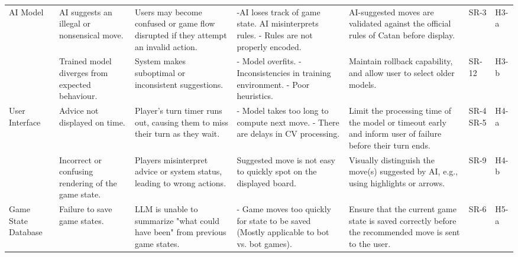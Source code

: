 \documentclass{article}
\begin{document}
\begin{landscape}
\begin{tabularx}{\linewidth}{|P{2.5cm}|Y|Y|Y|Y|P{1cm}|P{1cm}|}
        \hline

        AI Model &
        AI suggests an illegal or nonsensical move. &
        Users may become confused or game flow disrupted if they attempt an invalid action. &
        -AI loses track of game state. \newline AI misinterprets rules. \newline - Rules are not properly encoded. &
        AI-suggested moves are validated against the official rules of Catan before display. &
        SR-3 &
        H3-a \\

        &
        Trained model diverges from expected behaviour. &
        System makes suboptimal or inconsistent suggestions. &
        - Model overfits. \newline - Inconsistencies in training environment. \newline - Poor heuristics. &
        Maintain rollback capability, and allow user to select older models. &
        SR-12 &
        H3-b \\


        \hline

        User Interface &
        Advice not displayed on time. &
        Player's turn timer runs out, causing them to miss their turn as they wait. &
        - Model takes too long to compute next move. \newline - There are delays in CV processing. &
        Limit the processing time of the model or timeout early and inform user of failure before their turn ends. &
        SR-4 \newline SR-5 &
        H4-a \\

        &
        Incorrect or confusing rendering of the game state. &
        Players misinterpret advice or system status, leading to wrong actions. &
        Suggested move is not easy to quickly spot on the displayed board. &
        Visually distinguish the move(s) suggested by AI, e.g., using highlights or arrows. &
        SR-9 &
        H4-b \\

        \hline

        Game State Database &
        Failure to save game states. &
        LLM is unable to summarize "what could have been" from previous game states. &
        - Game moves too quickly for state to be saved (Mostly applicable to bot vs. bot games). &
        Ensure that the current game state is saved correctly before the recommended move is sent to the user. &
        SR-6 &
        H5-a \\


\end{tabularx}
\end{landscape}
\end{document}

